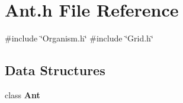 \section{Ant.\+h File Reference}
\label{Ant_8h}
{\ttfamily \#include \char`\"{}Organism.\+h\char`\"{}}\newline
{\ttfamily \#include \char`\"{}Grid.\+h\char`\"{}}\newline
\subsection*{Data Structures}
\begin{DoxyCompactItemize}
\item 
class \textbf{ Ant}
\end{DoxyCompactItemize}
